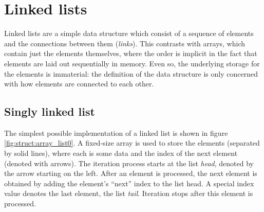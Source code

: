 \section{Linked lists}

Linked lists are a simple data structure which consist of a sequence of elements
and the connections between them (\textit{links}).  This contrasts with arrays,
which contain just the elements themselves, where the order is implicit in the
fact that elements are laid out sequentially in memory\footnotemark.  Even so,
the underlying storage for the elements is immaterial: the definition of the
data structure is only concerned with how elements are connected to each other.


\subsection{Singly linked list}

The simplest possible implementation of a linked list is shown in figure
\ref{fig:struct:array_list0}.  A fixed-size array is used to store the elements
(separated by solid lines), where each is some data and the index of the next
element (denoted with arrows).  The iteration process starts at the list
\textit{head}, denoted by the arrow starting on the left.  After an element is
processed, the next element is obtained by adding the element's ``next'' index
to the list head.  A special index value denotes the last element, the list
\textit{tail}.  Iteration stops after this element is processed.

